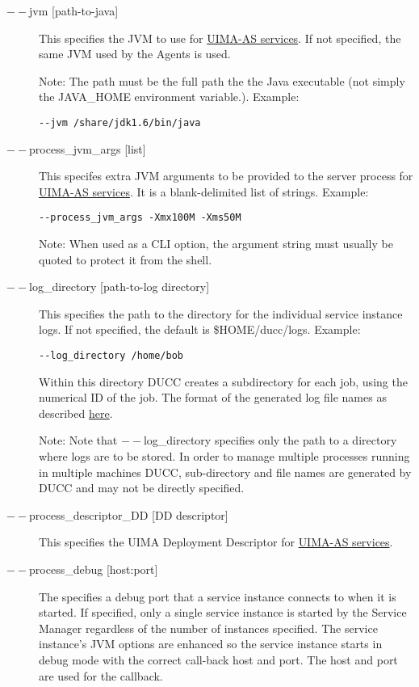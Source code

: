 \begin{description}
        \item[$--$jvm {[path-to-java]}] This specifies the JVM to use for 
          \hyperref[sec:services.types]{UIMA-AS services}. If not
          specified, the same JVM used by the Agents is used.  

          Note: The path must be the full path the the Java executable (not 
          simply the JAVA\_HOME environment variable.).  Example:
\begin{verbatim}
--jvm /share/jdk1.6/bin/java 
\end{verbatim}


        \item[$--$process\_jvm\_args {[list]} ]        
          This specifes extra JVM arguments to be provided to the server process for
          \hyperref[sec:services.types]{UIMA-AS services}. It is a blank-delimited 
            list of strings. Example: 
\begin{verbatim}
--process_jvm_args -Xmx100M -Xms50M
\end{verbatim}

          Note: When used as a CLI option, the argument string must usually be quoted to protect
          it from the shell.
    
          \item[$--$log\_directory {[path-to-log directory]}] This specifies the path to the directory for
            the individual service instance logs. If not specified, the default is \$HOME/ducc/logs. Example:
\begin{verbatim}
--log_directory /home/bob 
\end{verbatim}
        
        Within this directory DUCC creates a subdirectory for each job, using the numerical 
        ID of the job. The format of the generated log file names as described
        \hyperref[chap:job-logs]{here}.
        
        Note: Note that $--$log\_directory specifies only the path to a directory where 
        logs are to be stored. In order to manage multiple processes running in multiple 
        machines DUCC, sub-directory and file names are generated by DUCC and may 
        not be directly specified. 

      \item[$--$process\_descriptor\_DD {[DD descriptor]}] 
        This specifies the UIMA Deployment Descriptor for \hyperref[sec:services.types]{UIMA-AS services}.

      \item[$--$process\_debug {[host:port]}]        
        The specifies a debug port that a service instance connects to when it is started.  If specified,
        only a single service instance is started by the Service Manager regardless of the number of
        instances specified.  The service instance's JVM options are enhanced so the service instance
        starts in debug mode with the correct call-back host and port.  The host and port are used
        for the callback.


\end{description}
